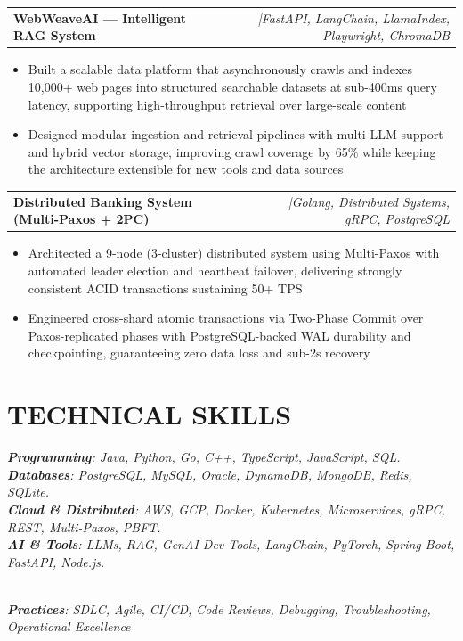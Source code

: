 \documentclass[letterpaper,10pt]{report}
\makeatletter
\newcommand{\resumeItem}[1]{
  \item\normalsize{
    {#1 \vspace{-2pt}}
  }
}
\newcommand{\resumeSubheadingExp}[2]{
  \vspace{-1pt}\item
    \begin{tabular*}{1.001\textwidth}[t]{l@{\extracolsep{\fill}}r}
      \textbf{#1} & \textit{\normalsize #2} \\
    \end{tabular*}\vspace{-7pt}
}
\newcommand{\resumeItemListStart}{\begin{itemize}}
\newcommand{\resumeItemListEnd}{\end{itemize}\vspace{-18pt}}
\makeatother
\begin{document}
\resumeSubheadingExp
{WebWeaveAI --- Intelligent RAG System}{|FastAPI, LangChain, LlamaIndex, Playwright, ChromaDB}
\resumeItemListStart
    \resumeItem{Built a scalable data platform that asynchronously crawls and indexes 10,000+ web pages into structured searchable datasets at sub-400ms query latency, supporting high-throughput retrieval over large-scale content}
    \resumeItem{Designed modular ingestion and retrieval pipelines with multi-LLM support and hybrid vector storage, improving crawl coverage by 65\% while keeping the architecture extensible for new tools and data sources}
\resumeItemListEnd

\resumeSubheadingExp
{Distributed Banking System (Multi-Paxos + 2PC)}{|Golang, Distributed Systems, gRPC, PostgreSQL}
\resumeItemListStart
    \resumeItem{Architected a 9-node (3-cluster) distributed system using Multi-Paxos with automated leader election and heartbeat failover, delivering strongly consistent ACID transactions sustaining 50+ TPS}
    \resumeItem{Engineered cross-shard atomic transactions via Two-Phase Commit over Paxos-replicated phases with PostgreSQL-backed WAL durability and checkpointing, guaranteeing zero data loss and sub-2s recovery}
\resumeItemListEnd

\vspace{4pt}
\section{\color{colorOption} TECHNICAL SKILLS}
 \begin{itemize}[leftmargin=0.15in, label={}]
   \normalsize{\item{
     \textit{\textbf{Programming}: Java, Python, Go, C++, TypeScript, JavaScript, SQL.} \\
     \textit{\textbf{Databases}: PostgreSQL, MySQL, Oracle, DynamoDB, MongoDB, Redis, SQLite.} \\
     \textit{\textbf{Cloud \& Distributed}: AWS, GCP, Docker, Kubernetes, Microservices, gRPC, REST, Multi-Paxos, PBFT.} \\
     \textit{\textbf{AI \& Tools}: LLMs, RAG, GenAI Dev Tools, LangChain, PyTorch, Spring Boot, FastAPI, Node.js.}
    }}\\
    \textit{\textbf{Practices}: SDLC, Agile, CI/CD, Code Reviews, Debugging, Troubleshooting, Operational Excellence}
  \end{itemize}
\end{document}
